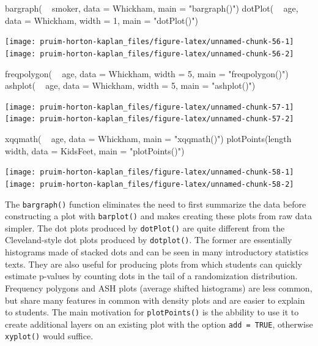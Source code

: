 \begin{Schunk}
\begin{Sinput}
bargraph( ~ smoker, data = Whickham, main = "bargraph()")
dotPlot( ~ age, data = Whickham, width = 1, main = "dotPlot()")
\end{Sinput}


\begin{center}\texttt{[image: pruim-horton-kaplan\_files/figure-latex/unnamed-chunk-56-1]} \texttt{[image: pruim-horton-kaplan\_files/figure-latex/unnamed-chunk-56-2]} \end{center}

\end{Schunk}\begin{Schunk}
\begin{Sinput}
freqpolygon( ~ age, data = Whickham, width = 5, main = "freqpolygon()")
ashplot( ~ age, data = Whickham, width = 5, main = "ashplot()")
\end{Sinput}


\begin{center}\texttt{[image: pruim-horton-kaplan\_files/figure-latex/unnamed-chunk-57-1]} \texttt{[image: pruim-horton-kaplan\_files/figure-latex/unnamed-chunk-57-2]} \end{center}

\end{Schunk}\begin{Schunk}
\begin{Sinput}
xqqmath( ~ age, data = Whickham, main = "xqqmath()")
plotPoints(length ~ width, data = KidsFeet, main = "plotPoints()")
\end{Sinput}


\begin{center}\texttt{[image: pruim-horton-kaplan\_files/figure-latex/unnamed-chunk-58-1]} \texttt{[image: pruim-horton-kaplan\_files/figure-latex/unnamed-chunk-58-2]} \end{center}

\end{Schunk}

The \texttt{bargraph()} function eliminates the need to first summarize
the data before constructing a plot with \texttt{barplot()} and makes
creating these plots from raw data simpler. The dot plots produced by
\texttt{dotPlot()} are quite different from the Cleveland-style dot
plots produced by \texttt{dotplot()}. The former are essentially
histograms made of stacked dots and can be seen in many introductory
statistics texts. They are also useful for producing plots from which
students can quickly estimate p-values by counting dots in the tail of a
randomization distribution. Frequency polygons and ASH plots (average
shifted histograms) are less common, but share many features in common
with density plots and are easier to explain to students. The main
motivation for \texttt{plotPoints()} is the abbility to use it to create
additional layers on an existing plot with the option
\texttt{add\ =\ TRUE}, otherwise \texttt{xyplot()} would suffice.

